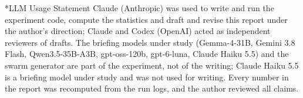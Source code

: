\documentclass[10pt]{article}
\makeatletter
\renewcommand\section{\@startsection{section}{1}{\z@}{10pt plus 2pt}{4pt}{\normalfont\large\bfseries}}
\makeatother
\begin{document}
\section*{LLM Usage Statement}
Claude (Anthropic) was used to write and run the experiment code, compute the statistics and draft and revise this report under the author's direction; Claude and Codex (OpenAI) acted as independent reviewers of drafts. The briefing models under study (Gemma-4-31B, Gemini 3.8 Flash, Qwen3.5-35B-A3B, gpt-oss-120b, gpt-6-luna, Claude Haiku 5.5) and the swarm generator are part of the experiment, not of the writing; Claude Haiku 5.5 is a briefing model under study and was not used for writing. Every number in the report was recomputed from the run logs, and the author reviewed all claims.
\end{document}
